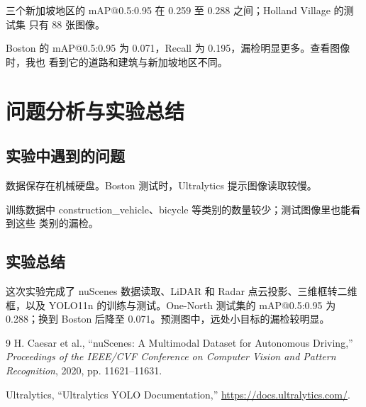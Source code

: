 \documentclass[UTF8,zihao=5,scheme=chinese]{ctexart}
\begin{document}
三个新加坡地区的 mAP@0.5:0.95 在 0.259 至 0.288 之间；Holland Village 的测试集
只有 88 张图像。

Boston 的 mAP@0.5:0.95 为 0.071，Recall 为 0.195，漏检明显更多。查看图像时，我也
看到它的道路和建筑与新加坡地区不同。

\section{问题分析与实验总结}

\subsection{实验中遇到的问题}

数据保存在机械硬盘。Boston 测试时，Ultralytics 提示图像读取较慢。

训练数据中 construction\_vehicle、bicycle 等类别的数量较少；测试图像里也能看到这些
类别的漏检。

\subsection{实验总结}

这次实验完成了 nuScenes 数据读取、LiDAR 和 Radar 点云投影、三维框转二维框，以及
YOLO11n 的训练与测试。One-North 测试集的 mAP@0.5:0.95 为 0.288；换到 Boston 后降至
0.071。预测图中，远处小目标的漏检较明显。

\begin{thebibliography}{9}
  H. Caesar et al., ``nuScenes: A Multimodal Dataset for Autonomous Driving,''
  \textit{Proceedings of the IEEE/CVF Conference on Computer Vision and Pattern Recognition},
  2020, pp. 11621--11631.

  Ultralytics, ``Ultralytics YOLO Documentation,''
  \url{https://docs.ultralytics.com/}.

\end{thebibliography}
\end{document}
